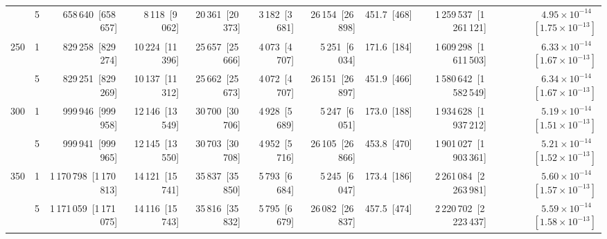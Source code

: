 \begin{tabular}{llrrrrrrrr}
 & 5 & 658\,640~{\footnotesize[658\,657]} & 8\,118~{\footnotesize[9\,062]} & 20\,361~{\footnotesize[20\,373]} & 3\,182~{\footnotesize[3\,681]} & 26\,154~{\footnotesize[26\,898]} & 451.7~{\footnotesize[468]} & 1\,259\,537~{\footnotesize[1\,261\,121]} & $4.95\!\times\!10^{-14}$~{\footnotesize $[1.75\!\times\!10^{-13}]$} \\
\cline{1-10}
\multirow[t]{2}{*}{250} & 1 & 829\,258~{\footnotesize[829\,274]} & 10\,224~{\footnotesize[11\,396]} & 25\,657~{\footnotesize[25\,666]} & 4\,073~{\footnotesize[4\,707]} & 5\,251~{\footnotesize[6\,034]} & 171.6~{\footnotesize[184]} & 1\,609\,298~{\footnotesize[1\,611\,503]} & $6.33\!\times\!10^{-14}$~{\footnotesize $[1.67\!\times\!10^{-13}]$} \\
 & 5 & 829\,251~{\footnotesize[829\,269]} & 10\,137~{\footnotesize[11\,312]} & 25\,662~{\footnotesize[25\,673]} & 4\,072~{\footnotesize[4\,707]} & 26\,151~{\footnotesize[26\,897]} & 451.9~{\footnotesize[466]} & 1\,580\,642~{\footnotesize[1\,582\,549]} & $6.34\!\times\!10^{-14}$~{\footnotesize $[1.67\!\times\!10^{-13}]$} \\
\cline{1-10}
\multirow[t]{2}{*}{300} & 1 & 999\,946~{\footnotesize[999\,958]} & 12\,146~{\footnotesize[13\,549]} & 30\,700~{\footnotesize[30\,706]} & 4\,928~{\footnotesize[5\,689]} & 5\,247~{\footnotesize[6\,051]} & 173.0~{\footnotesize[188]} & 1\,934\,628~{\footnotesize[1\,937\,212]} & $5.19\!\times\!10^{-14}$~{\footnotesize $[1.51\!\times\!10^{-13}]$} \\
 & 5 & 999\,941~{\footnotesize[999\,965]} & 12\,145~{\footnotesize[13\,550]} & 30\,703~{\footnotesize[30\,708]} & 4\,952~{\footnotesize[5\,716]} & 26\,105~{\footnotesize[26\,866]} & 453.8~{\footnotesize[470]} & 1\,901\,027~{\footnotesize[1\,903\,361]} & $5.21\!\times\!10^{-14}$~{\footnotesize $[1.52\!\times\!10^{-13}]$} \\
\cline{1-10}
\multirow[t]{2}{*}{350} & 1 & 1\,170\,798~{\footnotesize[1\,170\,813]} & 14\,121~{\footnotesize[15\,741]} & 35\,837~{\footnotesize[35\,850]} & 5\,793~{\footnotesize[6\,684]} & 5\,245~{\footnotesize[6\,047]} & 173.4~{\footnotesize[186]} & 2\,261\,084~{\footnotesize[2\,263\,981]} & $5.60\!\times\!10^{-14}$~{\footnotesize $[1.57\!\times\!10^{-13}]$} \\
 & 5 & 1\,171\,059~{\footnotesize[1\,171\,075]} & 14\,116~{\footnotesize[15\,743]} & 35\,816~{\footnotesize[35\,832]} & 5\,795~{\footnotesize[6\,679]} & 26\,082~{\footnotesize[26\,837]} & 457.5~{\footnotesize[474]} & 2\,220\,702~{\footnotesize[2\,223\,437]} & $5.59\!\times\!10^{-14}$~{\footnotesize $[1.58\!\times\!10^{-13}]$} \\

\end{tabular}
